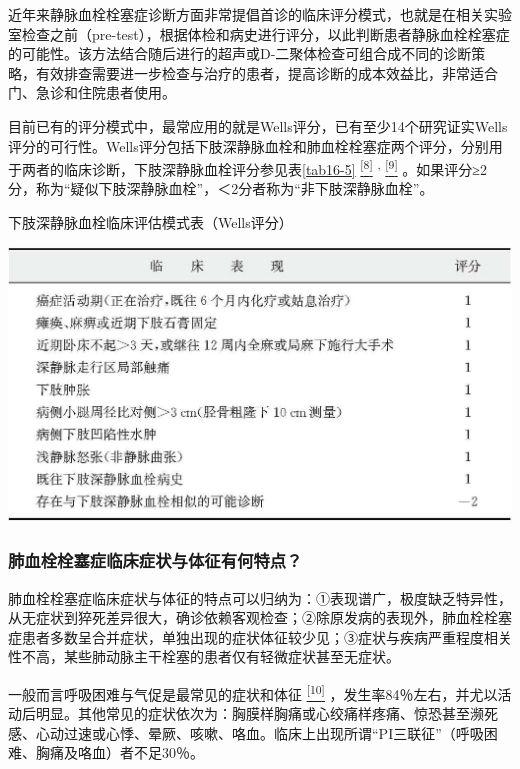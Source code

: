 近年来静脉血栓栓塞症诊断方面非常提倡首诊的临床评分模式，也就是在相关实验室检查之前（pre-test），根据体检和病史进行评分，以此判断患者静脉血栓栓塞症的可能性。该方法结合随后进行的超声或D-二聚体检查可组合成不同的诊断策略，有效排查需要进一步检查与治疗的患者，提高诊断的成本效益比，非常适合门、急诊和住院患者使用。

目前已有的评分模式中，最常应用的就是Wells评分，已有至少14个研究证实Wells评分的可行性。Wells评分包括下肢深静脉血栓和肺血栓栓塞症两个评分，分别用于两者的临床诊断，下肢深静脉血栓评分参见表\ref{tab16-5}
\protect\hyperlink{text00022.htmlux5cux23ch8-21}{\textsuperscript{{[}8{]}}}
\textsuperscript{,}
\protect\hyperlink{text00022.htmlux5cux23ch9-21}{\textsuperscript{{[}9{]}}}
。如果评分≥2分，称为“疑似下肢深静脉血栓”，＜2分者称为“非下肢深静脉血栓”。

\begin{table}[htbp]
\centering
\caption{下肢深静脉血栓临床评估模式表（Wells评分）}
\label{tab16-5}
\includegraphics{./images/Image00121.jpg}
\end{table}

\subsubsection{肺血栓栓塞症临床症状与体征有何特点？}

肺血栓栓塞症临床症状与体征的特点可以归纳为：①表现谱广，极度缺乏特异性，从无症状到猝死差异很大，确诊依赖客观检查；②除原发病的表现外，肺血栓栓塞症患者多数呈合并症状，单独出现的症状体征较少见；③症状与疾病严重程度相关性不高，某些肺动脉主干栓塞的患者仅有轻微症状甚至无症状。

一般而言呼吸困难与气促是最常见的症状和体征
\protect\hyperlink{text00022.htmlux5cux23ch10-21}{\textsuperscript{{[}10{]}}}
，发生率84％左右，并尤以活动后明显。其他常见的症状依次为：胸膜样胸痛或心绞痛样疼痛、惊恐甚至濒死感、心动过速或心悸、晕厥、咳嗽、咯血。临床上出现所谓“PI三联征”（呼吸困难、胸痛及咯血）者不足30％。

